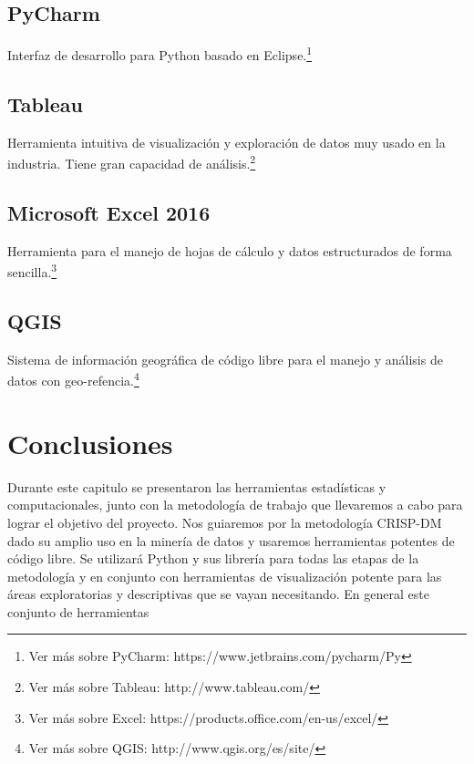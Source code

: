 \subsection{PyCharm}
Interfaz de desarrollo para Python basado en Eclipse.\footnote{Ver más sobre PyCharm: https://www.jetbrains.com/pycharm/Py}
\subsection{Tableau}
Herramienta intuitiva de visualización y exploración de datos muy usado en la industria. Tiene gran capacidad de análisis.\footnote{Ver más sobre Tableau: http://www.tableau.com/}
\subsection{Microsoft Excel 2016}
Herramienta para el manejo de hojas de cálculo y datos estructurados de forma sencilla.\footnote{Ver más sobre Excel: https://products.office.com/en-us/excel/}
\subsection{QGIS}
Sistema de información geográfica de código libre para el manejo y análisis de datos con geo-refencia.\footnote{Ver más sobre QGIS: http://www.qgis.org/es/site/}
\section{Conclusiones}

Durante este capitulo se presentaron las herramientas estadísticas y computacionales, junto con la metodología de trabajo que llevaremos a cabo para lograr el objetivo del proyecto. Nos guiaremos por la metodología CRISP-DM dado su amplio uso en la minería de datos y usaremos herramientas potentes de código libre. Se utilizará Python y sus librería para todas las etapas de la metodología y en conjunto con herramientas de visualización potente para las áreas exploratorias y descriptivas que se vayan necesitando. En general este conjunto de herramientas